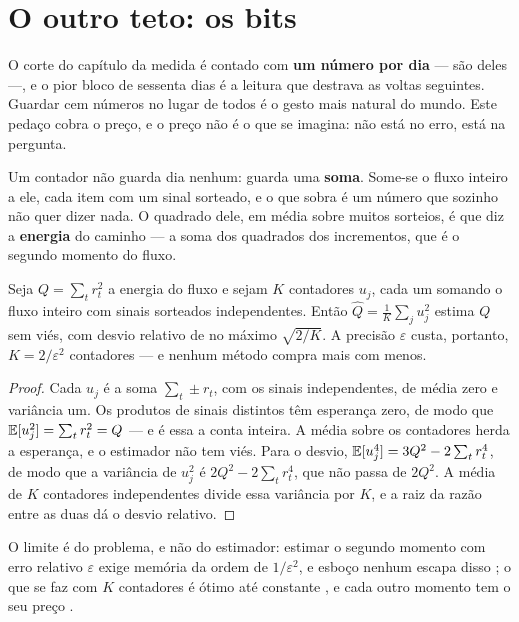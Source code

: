 \section{O outro teto: os bits}

O corte do capítulo da medida é contado com \textbf{um número por dia} --- são \numSerieDias{} deles ---,
e o pior bloco de sessenta dias é a leitura que destrava as voltas seguintes. Guardar cem números no
lugar de todos é o gesto mais natural do mundo. Este pedaço cobra o preço, e o preço não é o que se
imagina: não está no erro, está na pergunta.

Um contador não guarda dia nenhum: guarda uma \textbf{soma}. Some-se o fluxo inteiro a ele, cada
item com um sinal sorteado, e o que sobra é um número que sozinho não quer dizer nada. O quadrado
dele, em média sobre muitos sorteios, é que diz a \textbf{energia} do caminho --- a soma dos
quadrados dos incrementos, que é o segundo momento do fluxo.

\begin{proposicao}\label{prop:preco-do-resumo}
Seja $Q = \sum_t r_t^2$ a energia do fluxo e sejam $K$ contadores $u_j$, cada um somando o fluxo
inteiro com sinais sorteados independentes. Então $\hat Q = \frac{1}{K}\sum_j u_j^2$ estima $Q$ sem
viés, com desvio relativo de no máximo $\sqrt{2/K}$. A precisão $\varepsilon$ custa, portanto,
$K = 2/\varepsilon^2$ contadores --- e nenhum método compra mais com menos.
\end{proposicao}

\begin{proof}
Cada $u_j$ é a soma $\sum_t \pm r_t$, com os sinais independentes, de média zero e variância um.
Os produtos de sinais distintos têm esperança zero, de modo que $\mathbb{E}[u_j^2] = \sum_t r_t^2 = Q$ --- e
é essa a conta inteira. A média sobre os contadores herda a esperança, e o estimador não tem viés.
Para o desvio, $\mathbb{E}[u_j^4] = 3Q^2 - 2\sum_t r_t^4$, de modo que a variância de $u_j^2$ é
$2Q^2 - 2\sum_t r_t^4$, que não passa de $2Q^2$. A média de $K$ contadores independentes divide
essa variância por $K$, e a raiz da razão entre as duas dá o desvio relativo.
\end{proof}

O limite é do problema, e não do estimador: estimar o segundo momento com erro relativo
$\varepsilon$ exige memória da ordem de $1/\varepsilon^2$, e esboço nenhum escapa disso
\cite{alon1999space}; o que se faz com $K$ contadores é ótimo até constante \cite{indyk2005optimal},
e cada outro momento tem o seu preço \cite{woodruff2004optimal}.

